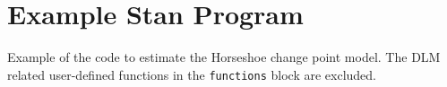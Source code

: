 \section{Example Stan Program}
\label{dlm:sec:example-stan-program}

Example of the code to estimate the Horseshoe change point model.
The DLM related user-defined functions in the \texttt{functions} block are excluded.


\inputminted[firstline=5,style=bw]{stan}{../dlm-shrinkage/stan/changepoint_horseshoe.stan.mustache}  


